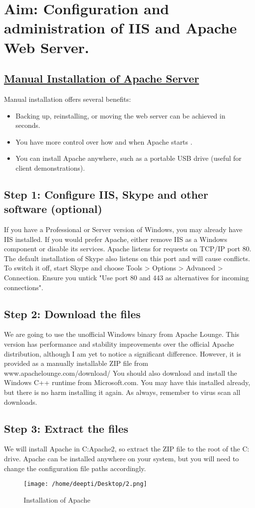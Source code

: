 
\section*{\fontsize{16}{14}\selectfont Aim: Configuration and administration of IIS and Apache Web Server.}
\subsection*{\underline{\textbf{Manual Installation of Apache Server}}}
Manual installation offers several benefits: 
\begin{itemize}
\item Backing up, reinstalling, or moving the web server can be achieved in seconds.
\item You have more control over how and when Apache starts .
\item You can install Apache anywhere, such as a portable USB drive (useful for client demonstrations). 
\end{itemize}

\subsection*{Step 1: Configure IIS, Skype and other software (optional)}

If you have a Professional or Server version of Windows, you may already have IIS installed. If you would prefer Apache, either remove IIS as a Windows component or disable its services.
Apache listens for requests on TCP/IP port 80. The default installation of Skype also listens on this port and will cause conflicts. To switch it off, start Skype and choose Tools > Options > Advanced > Connection. Ensure you untick "Use port 80 and 443 as alternatives for incoming connections".
\subsection*{Step 2: Download the files}
We are going to use the unofficial Windows binary from Apache Lounge. This version has performance and stability improvements over the official Apache distribution, although I am yet to notice a significant difference. However, it is provided as a manually installable ZIP file from www.apachelounge.com/download/
You should also download and install the Windows C++ runtime from Microsoft.com. You may have this installed already, but there is no harm installing it again.
As always, remember to virus scan all downloads.
\subsection*{Step 3: Extract the files}
We will install Apache in C:Apache2, so extract the ZIP file to the root of the C: drive.
Apache can be installed anywhere on your system, but you will need to change the configuration file paths accordingly.
\begin{figure}[!ht]
\centering
\texttt{[image: /home/deepti/Desktop/2.png]}                   
\caption{Installation of Apache}
\hspace{-1.5em}
\end{figure}

